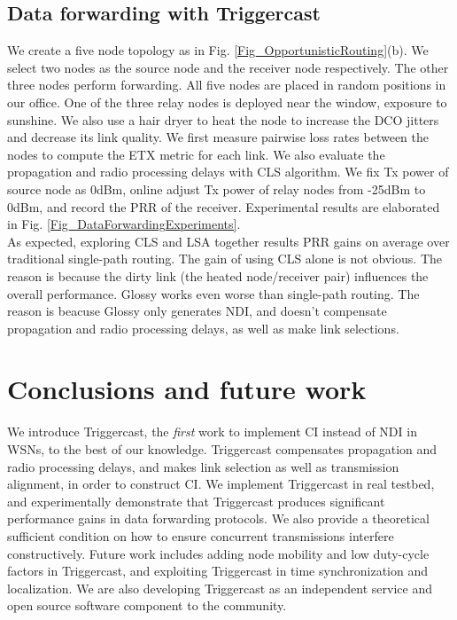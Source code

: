 \documentclass[conference]{IEEEtran}
\begin{document}
\subsection{Data forwarding with Triggercast}
\indent We create a five node topology as in Fig. \ref{Fig_OpportunisticRouting}(b).
We select two nodes as the source node and the receiver node respectively.
The other three nodes perform forwarding.
All five nodes are placed in random positions in our office.
One of the three relay nodes is deployed near the window, exposure to sunshine.
We also use a hair dryer to heat the node to increase the DCO jitters and decrease its link quality.
We first measure pairwise loss rates between the nodes to compute the ETX metric for each link.
We also evaluate the propagation and radio processing delays with CLS algorithm.
We fix Tx power of source node as 0dBm, online adjust Tx power of relay nodes from -25dBm to 0dBm, and record the PRR of the receiver.
Experimental results are elaborated in Fig. \ref{Fig_DataForwardingExperiments}.\\
\indent As expected, exploring CLS and LSA together results  PRR gains on average over traditional single-path routing.
The gain of using CLS alone is not obvious.
The reason is because the dirty link (the heated node/receiver pair) influences the overall performance.
Glossy works even worse than single-path routing. The reason is beacuse Glossy only generates NDI, and doesn't compensate propagation and radio processing delays, as well as make link selections.
\section{Conclusions and future work}
\label{Sec_Conclusion}
\indent We introduce Triggercast, the \emph{first} work to implement CI instead of NDI in WSNs, to the best of our knowledge.
Triggercast compensates propagation and radio processing delays, and makes link selection as well as transmission alignment, in order to construct CI.
We implement Triggercast in real testbed, and experimentally demonstrate that Triggercast produces significant performance gains in data forwarding protocols.
We also provide a theoretical sufficient condition on how to ensure concurrent transmissions interfere constructively.
Future work includes adding node mobility and low duty-cycle factors in Triggercast, and exploiting Triggercast in time synchronization and localization.
We are also developing Triggercast as an independent service and open source software component to the community.





\ifCLASSOPTIONcaptionsoff
  \newpage
\fi







 
\end{document}
